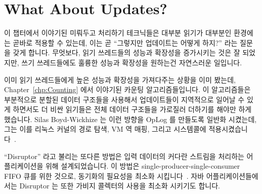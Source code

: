 
\section{What About Updates?}
\label{sec:defer:What About Updates?}

이 챕터에서 이야기된 미뤄두고 처리하기 테크닉들은 대부분 읽기가 대부분인
환경에는 곧바로 적용할 수 있는데, 이는 곧 ``그렇지만 업데이트는 어떻게 하지?''
라는 질문을 갖게 합니다.
무엇보다, 읽기 쓰레드들의 성능과 확장성을 증가시키는 것은 잘 되었지만, 쓰기
쓰레드들에도 훌륭한 성능과 확장성을 원하는건 자연스러운 일입니다.
\iffalse

The deferred-processing techniques called out in this chapter are most
directly applicable to read-mostly situations, which begs the question
``But what about updates?''
After all, increasing the performance and scalability of readers is all
well and good, but it is only natural to also want great performance and
scalability for writers.
\fi

이미 읽기 쓰레드들에게 높은 성능과 확장성을 가져다주는 상황을 이미 봤는데,
Chapter~\ref{chp:Counting} 에서 이야기된 카운팅 알고리즘들입니다.
이 알고리즘들은 부분적으로 분할된 데이터 구조들을 사용해서 업데이트들이
지역적으로 일어날 수 있게 하면서도 더 비싼 읽기들은 전체 데이터 구조들을
가로질러 더하기를 해야만 하게 했습니다.
Silas Boyd-Wickhize 는 이런 방향을 OpLog 를 만들도록 일반화 시켰는데, 그는 이를
리눅스 커널의 경로 탐색, VM 역 매핑, 그리고  시스템콜에
적용시켰습니다~\cite{SilasBoydWickizerPhD}.
\iffalse

We have already seen one situation featuring high performance and
scalability for writers, namely the counting algorithms surveyed in
Chapter~\ref{chp:Counting}.
These algorithms featured partially partitioned data structures so
that updates can operate locally, while the more-expensive reads
must sum across the entire data structure.
Silas Boyd-Wickhizer has generalized this notion to produce
OpLog, which he has applied to
Linux-kernel pathname lookup, VM reverse mappings, and the \co{stat()} system
call~\cite{SilasBoydWickizerPhD}.
\fi

``Disruptor'' 라고 불리는 또다른 방법은 입력 데이터의 커다란 스트림을 처리하는
어플리케이션을 위해 설계되었습니다.
이 방법은 single-producer-single-consumer FIFO 큐를 위한 것으로, 동기화의
필요성을 최소화 시킵니다~\cite{AdrianSutton2013LCA:Disruptor}.
자바 어플리케이션들에서는 Disruptor 는 또한 가비지 콜렉터의 사용을 최소화
시키기도 합니다.

